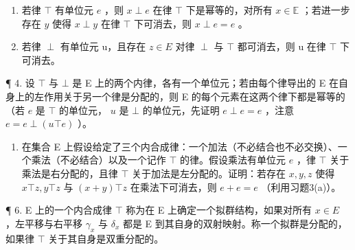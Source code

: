 \begin{enumerate}
\def\labelenumi{(\alph{enumi})}
\item
  若律 \(\top\) 有单位元 \(e\) ，则 \(x \perp e\) 在律 \(\top\) 下是幂等的，对所有 \(x \in \mathbb{E}\) ；若进一步存在 \(y\) 使得 \(x \perp y\) 在律 \(\top\) 下可消去，则 \(x \perp e = e\) 。
\item
  若律 \(\perp\) 有单位元 u，且存在 \(z \in E\) 对律 \(\perp\) 与 \(\top\) 都可消去，则 u 在律 \(\top\) 下可消去。
\end{enumerate}

¶ 4. 设 \(\top\) 与 \(\bot\) 是 E 上的两个内律，各有一个单位元；若由每个律导出的 E 在自身上的左作用关于另一个律是分配的，则 E 的每个元素在这两个律下都是幂等的（若 \(e\) 是 \(\top\) 的单位元， \(u\) 是 \(\bot\) 的单位元，先证明 \(e \perp e = e\) ，注意 \(e = e \perp (u \top e)\) ）。

\begin{enumerate}
\def\labelenumi{\arabic{enumi}.}
\setcounter{enumi}{4}
\tightlist
\item
  在集合 E 上假设给定了三个内合成律：一个加法（不必结合也不必交换）、一个乘法（不必结合）以及一个记作 \(\top\) 的律。假设乘法有单位元 \(e\) ，律 \(\top\) 关于乘法是右分配的，且律 \(\top\) 关于加法是左分配的。证明：若存在 \(x, y, z\) 使得 \(x \top z, y \top z\) 与 \((x + y) \top z\) 在乘法下可消去，则 \(e + e = e\) （利用习题3(a)）。
\end{enumerate}

¶ 6. E 上的一个内合成律 \(\top\) 称为在 E 上确定一个拟群结构，如果对所有 \(x \in E\) ，左平移与右平移 \(\gamma_x\) 与 \(\delta_x\) 都是 E 到其自身的双射映射。称一个拟群是分配的，如果律 \(\top\) 关于其自身是双重分配的。

